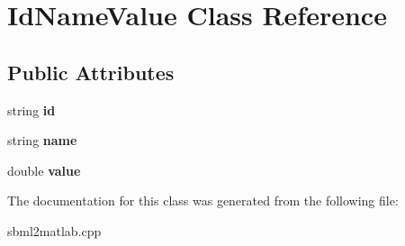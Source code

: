 \hypertarget{class_id_name_value}{\section{Id\-Name\-Value Class Reference}
\label{class_id_name_value}
}
\subsection*{Public Attributes}
\begin{DoxyCompactItemize}
\item 
\hypertarget{class_id_name_value_a959cebc3b15afaa51c6ea8efad1fbf65}{string {\bfseries id}}\label{class_id_name_value_a959cebc3b15afaa51c6ea8efad1fbf65}

\item 
\hypertarget{class_id_name_value_a4aa1a5310fa5a75c4951ae696e496998}{string {\bfseries name}}\label{class_id_name_value_a4aa1a5310fa5a75c4951ae696e496998}

\item 
\hypertarget{class_id_name_value_a8d2455731784e8a95e88d0183231863c}{double {\bfseries value}}\label{class_id_name_value_a8d2455731784e8a95e88d0183231863c}

\end{DoxyCompactItemize}


The documentation for this class was generated from the following file\-:\begin{DoxyCompactItemize}
\item 
sbml2matlab.\-cpp\end{DoxyCompactItemize}
